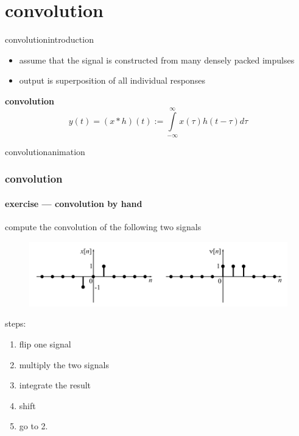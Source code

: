     \section{convolution}
        \begin{frame}{convolution}{introduction}

            \begin{itemize}
                \item<2-> assume that the signal is constructed from many densely packed impulses
                \item<2->[$\Rightarrow$] output is superposition of all individual responses
            \end{itemize}
            \pause
            \bigskip
            \textbf{convolution}
            \begin{equation*}
                y(t) = (x \ast h)(t) := \int\limits_{-\infty}^{\infty}x(\tau)h(t-\tau)d\tau
            \end{equation*}
        \end{frame}
\begin{frame}{convolution}{animation}
            \vspace{-5mm}
\end{frame}
    
\begin{frame}\frametitle{convolution}\framesubtitle{exercise --- convolution by hand}
    compute the convolution of the following two signals
    \begin{figure}%
    \includegraphics[width=.75\columnwidth]{graph/convolution_exercise}%
    \end{figure}
    \bigskip
    steps:
    \begin{enumerate}
        \item   flip one signal
        \item   multiply the two signals
        \item   integrate the result
        \item   shift
        \item   go to 2.
    \end{enumerate}
\end{frame}
    
